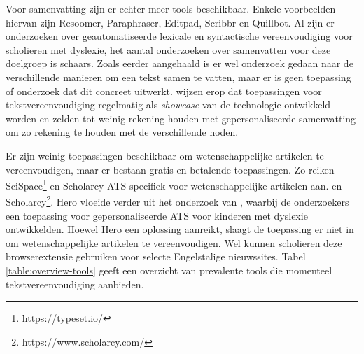 \medspace

Voor samenvatting zijn er echter meer tools beschikbaar. Enkele voorbeelden hiervan zijn Resoomer, Paraphraser, Editpad, Scribbr en Quillbot. Al zijn er onderzoeken over geautomatiseerde lexicale en syntactische vereenvoudiging voor scholieren met dyslexie, het aantal onderzoeken over samenvatten voor deze doelgroep is schaars. Zoals eerder aangehaald is er wel onderzoek gedaan naar de verschillende manieren om een tekst samen te vatten, maar er is geen toepassing of onderzoek dat dit concreet uitwerkt. \textcite{Sanja2021} wijzen erop dat toepassingen voor tekstvereenvoudiging regelmatig als \textit{showcase} van de technologie ontwikkeld worden en zelden tot weinig rekening houden met gepersonaliseerde samenvatting om zo rekening te houden met de verschillende noden.

\medspace

Er zijn weinig toepassingen beschikbaar om wetenschappelijke artikelen te vereenvoudigen, maar er bestaan gratis en betalende toepassingen. Zo reiken SciSpace\footnote{https://typeset.io/} en Scholarcy ATS specifiek voor wetenschappelijke artikelen aan.  en Scholarcy\footnote{https://www.scholarcy.com/}. Hero vloeide verder uit het onderzoek van \textcite{Bingel2018}, waarbij de onderzoekers een toepassing voor gepersonaliseerde ATS voor kinderen met dyslexie ontwikkelden. Hoewel Hero een oplossing aanreikt, slaagt de toepassing er niet in om wetenschappelijke artikelen te vereenvoudigen. Wel kunnen scholieren deze browserextensie gebruiken voor selecte Engelstalige nieuwssites. Tabel \ref{table:overview-tools} geeft een overzicht van prevalente tools die momenteel tekstvereenvoudiging aanbieden.

